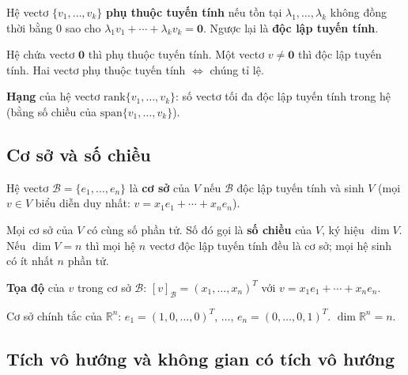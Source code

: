 \documentclass[12pt,a4paper]{article}
\begin{document}
\begin{dinhnghia}
  Hệ vectơ $\{v_1, \ldots, v_k\}$ \textbf{phụ thuộc tuyến tính} nếu tồn tại $\lambda_1, \ldots, \lambda_k$ không đồng thời bằng 0 sao cho $\lambda_1 v_1 + \cdots + \lambda_k v_k = \mathbf{0}$. Ngược lại là \textbf{độc lập tuyến tính}.
\end{dinhnghia}

\begin{tinhchat}
  Hệ chứa vectơ $\mathbf{0}$ thì phụ thuộc tuyến tính. Một vectơ $v \ne \mathbf{0}$ thì độc lập tuyến tính. Hai vectơ phụ thuộc tuyến tính $\Leftrightarrow$ chúng tỉ lệ.
\end{tinhchat}

\begin{dinhnghia}
  \textbf{Hạng} của hệ vectơ $\mathrm{rank}\{v_1, \ldots, v_k\}$: số vectơ tối đa độc lập tuyến tính trong hệ (bằng số chiều của $\mathrm{span}\{v_1, \ldots, v_k\}$).
\end{dinhnghia}

\subsection{Cơ sở và số chiều}

\begin{dinhnghia}
  Hệ vectơ $\mathcal{B} = \{e_1, \ldots, e_n\}$ là \textbf{cơ sở} của $V$ nếu $\mathcal{B}$ độc lập tuyến tính và sinh $V$ (mọi $v \in V$ biểu diễn duy nhất: $v = x_1 e_1 + \cdots + x_n e_n$).
\end{dinhnghia}

\begin{dinhly}
  Mọi cơ sở của $V$ có cùng số phần tử. Số đó gọi là \textbf{số chiều} của $V$, ký hiệu $\dim V$. Nếu $\dim V = n$ thì mọi hệ $n$ vectơ độc lập tuyến tính đều là cơ sở; mọi hệ sinh có ít nhất $n$ phần tử.
\end{dinhly}

\begin{dinhnghia}
  \textbf{Tọa độ} của $v$ trong cơ sở $\mathcal{B}$: $[v]_{\mathcal{B}} = (x_1, \ldots, x_n)^T$ với $v = x_1 e_1 + \cdots + x_n e_n$.
\end{dinhnghia}

\begin{vidu}
  Cơ sở chính tắc của $\mathbb{R}^n$: $e_1 = (1,0,\ldots,0)^T$, $\ldots$, $e_n = (0,\ldots,0,1)^T$. $\dim \mathbb{R}^n = n$.
\end{vidu}

\subsection{Tích vô hướng và không gian có tích vô hướng}
\end{document}

